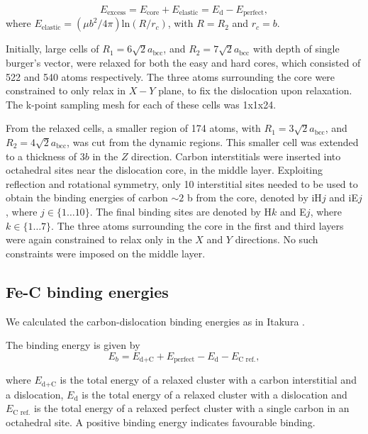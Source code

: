 \documentclass[a4paper,11pt]{article}
\begin{document}
\begin{equation}
 E_{\text{excess}} =   E_{\text{core}} + E_{\text{elastic}} = E_{\text{d}} - E_{\text{perfect}}   ,\label{eq:excessenergy}
 \end{equation} 
where
\(E_{\text{elastic}} = ( \mu b^2 / 4\pi )\text{ln}(R/ r_c)\), with \(R = R_2\) and \(r_c = b\).

Initially, large cells of \(R_1 = 6\sqrt{2}a_{\text{bcc}}\), and \(R_2 =
   7\sqrt{2}a_{\text{bcc}}\) with depth of single burger's vector, were relaxed
for both the easy and hard cores, which consisted of 522 and 540 atoms
respectively. The three atoms surrounding the core were constrained to only
relax in \(X-Y\) plane, to fix the dislocation upon relaxation. 
The k-point sampling mesh for each of these cells was 1x1x24.

From the relaxed cells, a smaller region of 174 atoms, with \(R_1 = 3\sqrt{2}a_{\text{bcc}}\), and \(R_2
   = 4\sqrt{2}a_{\text{bcc}}\), was cut from the dynamic regions. This smaller cell was extended to a
thickness of 3\(b\) in the \(Z\) direction. Carbon interstitials were inserted into octahedral sites
near the dislocation core, in the middle layer. Exploiting reflection and rotational symmetry,
only 10 interstitial sites needed to be used to obtain the binding energies of carbon \(\sim2\) b from
the core, denoted by iH\(j\) and iE\(j\), where \(j \in \{1\dots10\}\). The final binding sites are denoted
by H\(k\) and E\(j\), where \(k \in \{1\dots7\}\). The three atoms surrounding the core in the first and
third layers were again constrained to relax only in the \(X\) and \(Y\) directions. No such
constraints were imposed on the middle layer.


\subsection{Fe-C binding energies}
\label{sec:org4097a4e}
We calculated the carbon-dislocation binding energies as in Itakura
 \cite{itakura13_effec_hydrog_atoms_screw_disloc}.

The binding energy is given by 
\begin{equation}  
E_b = E_{\text{d+C}} + E_{\text{perfect}}- E_{\text{d}} - E_{\text{C ref.}},    
\end{equation}

where \(E_{\text{d+C}}\) is the total energy of a relaxed cluster with a
carbon interstitial and a dislocation, \(E_{\text{d}}\) is the total
energy of a relaxed cluster with a dislocation and \(E_{\text{C
    ref.}}\) is the total energy of a relaxed perfect cluster with a single carbon in
an octahedral site. A positive binding energy indicates favourable binding.
\end{document}

